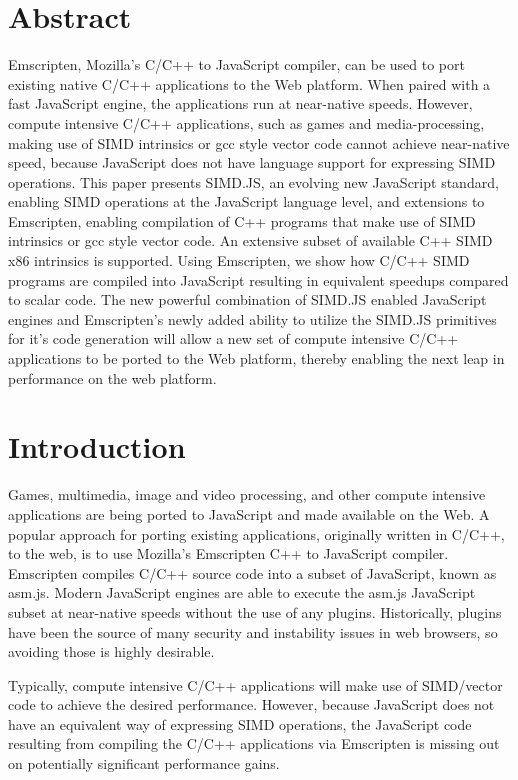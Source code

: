 \documentclass[preprint]{sigplanconf}
\begin{document}
\section{Abstract}
Emscripten, Mozilla's C/C++ to JavaScript compiler, can be used to port
existing native C/C++ applications to the Web platform.  When paired with
a fast JavaScript engine, the applications run at near-native speeds.
However, compute intensive C/C++ applications, such as games and 
media-processing, making use of SIMD intrinsics or gcc style vector code 
cannot achieve near-native speed, because JavaScript does not have 
language support for expressing SIMD operations.
This paper presents SIMD.JS, an evolving new JavaScript standard, 
enabling SIMD operations at the JavaScript language level, and extensions 
to Emscripten, enabling compilation of C++ programs that make use of 
SIMD intrinsics or gcc style vector code.  An extensive subset of 
available C++ SIMD x86 intrinsics is supported.
Using Emscripten, we show how C/C++ SIMD programs are compiled into 
JavaScript resulting in equivalent speedups compared to scalar code.  
The new powerful combination of SIMD.JS enabled JavaScript engines and 
Emscripten's newly added ability to utilize the SIMD.JS primitives for it's 
code generation will allow a new set of compute intensive C/C++ 
applications to be ported to the Web  platform, thereby enabling the
next leap in performance on the web platform.

\section{Introduction}

Games, multimedia, image and video processing, and other compute intensive
applications are being ported to JavaScript and made available on the Web.
A popular approach for porting existing applications, originally written in C/C++,
to the web, is to use Mozilla's Emscripten C++ to JavaScript compiler. Emscripten
compiles C/C++ source code into a subset of JavaScript, known as asm.js.
Modern JavaScript engines are able to execute the asm.js JavaScript subset
at near-native speeds without the use of any plugins.  Historically, plugins have
been the source of many security and instability issues in web browsers, so
avoiding those is highly desirable.

Typically, compute intensive C/C++ applications will make use of SIMD/vector
code to achieve the desired performance. However, because JavaScript does not have an equivalent
way of expressing SIMD operations, the JavaScript code resulting from 
compiling the C/C++ applications via Emscripten is missing out on potentially 
significant performance gains.
\end{document}
